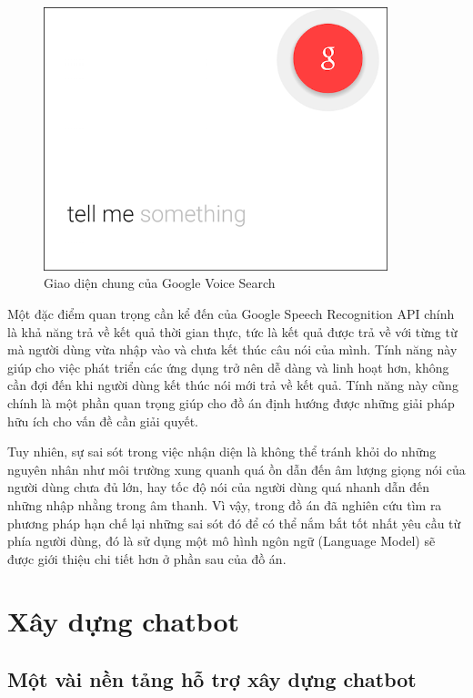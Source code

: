 \documentclass[12pt]{report}
\begin{document}
\begin{figure}[H]
  \centering
    \includegraphics[width=10cm]{Pics/Chap2/google-voice.png}
  \caption{Giao diện chung của Google Voice Search}
\end{figure}

Một đặc điểm quan trọng cần kể đến của Google Speech Recognition API chính là khả năng trả về kết quả thời gian thực, tức là kết quả được trả về với từng từ mà người dùng vừa nhập vào và chưa kết thúc câu nói của mình. Tính năng này giúp cho việc phát triển các ứng dụng trở nên dễ dàng và linh hoạt hơn, không cần đợi đến khi người dùng kết thúc nói mới trả về kết quả. Tính năng này cũng chính là một phần quan trọng giúp cho đồ án định hướng được những giải pháp hữu ích cho vấn đề cần giải quyết.

Tuy nhiên, sự sai sót trong việc nhận diện là không thể tránh khỏi do những nguyên nhân như môi trường xung quanh quá ồn dẫn đến âm lượng giọng nói của người dùng chưa đủ lớn, hay tốc độ nói của người dùng quá nhanh dẫn đến những nhập nhằng trong âm thanh. Vì vậy, trong đồ án đã nghiên cứu tìm ra phương pháp hạn chế lại những sai sót đó để có thể nắm bắt tốt nhất yêu cầu từ phía người dùng, đó là sử dụng một mô hình ngôn ngữ (Language Model) sẽ được giới thiệu chi tiết hơn ở phần sau của đồ án.

\section{Xây dựng chatbot}
\subsection{Một vài nền tảng hỗ trợ xây dựng chatbot}
\end{document}
